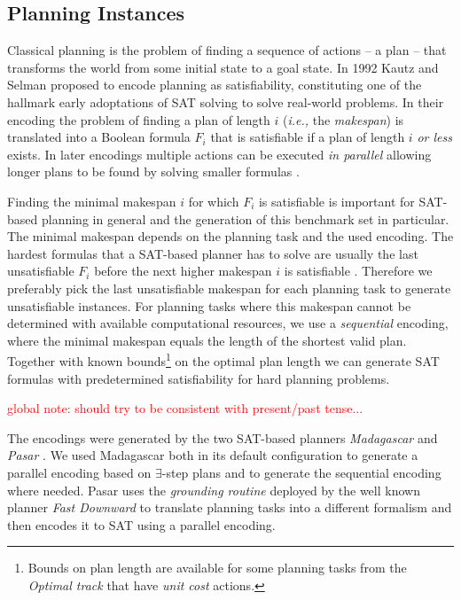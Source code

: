 \documentclass{elsarticle}
\begin{document}
\subsection{Planning Instances}
Classical planning is the problem of finding a sequence of actions -- a plan --
that transforms the world from some initial state to a goal state. In 1992 Kautz
and Selman \cite{Kautz1992} proposed to encode planning as satisfiability, constituting
one of the hallmark early adoptations of SAT solving to solve real-world problems. In
their encoding the problem of finding a plan of length $i$ (\textit{i.e.,} the
\emph{makespan}) is translated into a Boolean formula $F_i$ that is satisfiable
if a plan of length $i$ \emph{or less} exists. In later encodings multiple
actions can be executed \emph{in parallel} allowing longer plans to be found by
solving smaller formulas \cite{Rintanen2006, Rintanen2007, Balyo2013}.

Finding the minimal makespan $i$ for which $F_i$ is satisfiable is important for
SAT-based planning in general and the generation of this benchmark set in
particular. The minimal makespan depends on the planning task and the used
encoding. The hardest formulas that a SAT-based planner has to solve are usually
the last unsatisfiable $F_i$ before the next higher makespan $i$ is satisfiable
\cite{Rintanen2006}. Therefore we preferably pick the last unsatisfiable
makespan for each planning task to generate unsatisfiable instances. For
planning tasks where this makespan cannot be determined with available
computational resources, we use a \emph{sequential} encoding, where the minimal
makespan equals the length of the shortest valid plan. Together with known
bounds\footnote{Bounds on plan length are available for some planning tasks from
  the \emph{Optimal track} that have \emph{unit cost} actions.} on the optimal
plan length we can generate SAT formulas with predetermined satisfiability for
hard planning problems.

\textcolor{red}{global note: should try to be consistent with present/past tense...}

The encodings were generated by the two SAT-based planners \emph{Madagascar}
\cite{Madagascar14} and \emph{Pasar} \cite{Pasar19}. We used Madagascar both in
its default configuration to generate a parallel encoding based on
$\exists$-step plans and to generate the sequential encoding where needed. Pasar
uses the \emph{grounding routine} deployed by the well known planner \emph{Fast
  Downward} \cite{FastDownward06} to translate planning tasks into a different
formalism and then encodes it to SAT using a parallel encoding.
\end{document}
